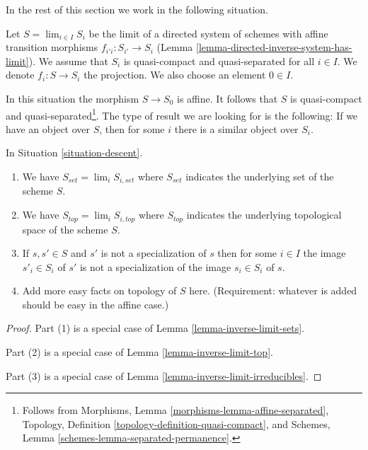 \noindent
In the rest of this section we work in the following situation.

\begin{situation}
\label{situation-descent}
Let $S = \lim_{i \in I} S_i$ be the limit of a directed system of schemes
with affine transition morphisms $f_{i'i} : S_{i'} \to S_i$
(Lemma \ref{lemma-directed-inverse-system-has-limit}).
We assume that $S_i$ is quasi-compact and quasi-separated for all $i \in I$.
We denote $f_i : S \to S_i$ the projection.
We also choose an element $0 \in I$.
\end{situation}

\noindent
In this situation the morphism $S \to S_0$ is affine. It follows
that $S$ is quasi-compact and quasi-separated\footnote{Follows
from Morphisms, Lemma \ref{morphisms-lemma-affine-separated},
Topology, Definition \ref{topology-definition-quasi-compact}, and
Schemes, Lemma \ref{schemes-lemma-separated-permanence}.}.
The type of result we are looking for is the following:
If we have an object over $S$, then for some $i$ there is a
similar object over $S_i$.

\begin{lemma}
\label{lemma-topology-limit}
In Situation \ref{situation-descent}.
\begin{enumerate}
\item We have $S_{set} = \lim_i S_{i, set}$ where $S_{set}$
indicates the underlying set of the scheme $S$.
\item We have $S_{top} = \lim_i S_{i, top}$ where $S_{top}$
indicates the underlying topological space of the scheme $S$.
\item If $s, s' \in S$ and $s'$ is not a specialization of $s$
then for some $i \in I$ the image $s'_i \in S_i$ of $s'$ is not
a specialization of the image $s_i \in S_i$ of $s$.
\item Add more easy facts on topology of $S$ here.
(Requirement: whatever is added should be easy in the affine case.)
\end{enumerate}
\end{lemma}

\begin{proof}
Part (1) is a special case of Lemma \ref{lemma-inverse-limit-sets}.

\medskip\noindent
Part (2) is a special case of Lemma \ref{lemma-inverse-limit-top}.

\medskip\noindent
Part (3) is a special case of Lemma \ref{lemma-inverse-limit-irreducibles}.
\end{proof}

